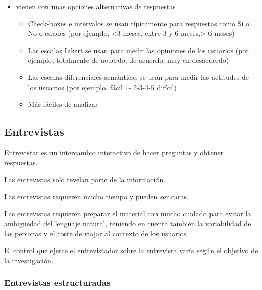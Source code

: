 \documentclass[12pt, twoside, openright]{report} %
\begin{document}
        \begin{itemize}
        
        \item
          vienen con unas opciones alternativas de respuestas

          \begin{itemize}
          
          \item
            Check-boxes e intervalos se usan típicamente para respuestas
            como Sí o No o edades (por ejemplo, \textless3 meses, entre
            3 y 6 meses,\textgreater{} 6 meses)
          \item
            Las escalas Likert se usan para medir las opiniones de los
            usuarios (por ejemplo, totalmente de acuerdo, de acuerdo,
            muy en desacuerdo)
          \item
            Las escalas diferenciales semánticas se usan para medir las
            actitudes de los usuarios (por ejemplo, fácil 1- 2-3-4-5
            difícil)
          \item
            Más fáciles de analizar
          \end{itemize}
        \end{itemize}

\subsection{Entrevistas}


        Entrevistar es un intercambio interactivo de hacer preguntas y
        obtener respuestas.

        Las entrevistas solo revelan parte de la información.

        Las entrevistas requieren mucho tiempo y pueden ser caras.

        Las entrevistas requieren preparar el material con mucho cuidado
        para evitar la ambigüedad del lenguaje natural, teniendo en
        cuenta también la variabilidad de las personas y el coste de
        viajar al contexto de los usuarios.

        El control que ejerce el entrevistador sobre la entrevista varía
        según el objetivo de la investigación.

\subsubsection{Entrevistas estructuradas}
\end{document}
